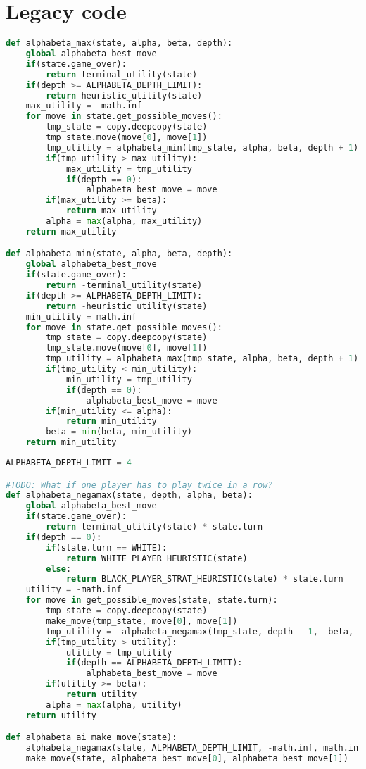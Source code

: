 \hypertarget{legacy-code}{%
\section{Legacy code}\label{legacy-code}}

\begin{lstlisting}[language=Python]
def alphabeta_max(state, alpha, beta, depth):
    global alphabeta_best_move
    if(state.game_over):
        return terminal_utility(state)
    if(depth >= ALPHABETA_DEPTH_LIMIT):
        return heuristic_utility(state)
    max_utility = -math.inf
    for move in state.get_possible_moves():
        tmp_state = copy.deepcopy(state)
        tmp_state.move(move[0], move[1])
        tmp_utility = alphabeta_min(tmp_state, alpha, beta, depth + 1)
        if(tmp_utility > max_utility):
            max_utility = tmp_utility
            if(depth == 0):
                alphabeta_best_move = move
        if(max_utility >= beta):
            return max_utility
        alpha = max(alpha, max_utility)
    return max_utility

def alphabeta_min(state, alpha, beta, depth):
    global alphabeta_best_move
    if(state.game_over):
        return -terminal_utility(state)
    if(depth >= ALPHABETA_DEPTH_LIMIT):
        return -heuristic_utility(state)
    min_utility = math.inf
    for move in state.get_possible_moves():
        tmp_state = copy.deepcopy(state)
        tmp_state.move(move[0], move[1])
        tmp_utility = alphabeta_max(tmp_state, alpha, beta, depth + 1)
        if(tmp_utility < min_utility):
            min_utility = tmp_utility
            if(depth == 0):
                alphabeta_best_move = move
        if(min_utility <= alpha):
            return min_utility
        beta = min(beta, min_utility)
    return min_utility
\end{lstlisting}

\begin{lstlisting}[language=Python]
ALPHABETA_DEPTH_LIMIT = 4

#TODO: What if one player has to play twice in a row?
def alphabeta_negamax(state, depth, alpha, beta):
    global alphabeta_best_move
    if(state.game_over):
        return terminal_utility(state) * state.turn
    if(depth == 0):
        if(state.turn == WHITE):
            return WHITE_PLAYER_HEURISTIC(state)
        else:
            return BLACK_PLAYER_STRAT_HEURISTIC(state) * state.turn
    utility = -math.inf
    for move in get_possible_moves(state, state.turn):
        tmp_state = copy.deepcopy(state)
        make_move(tmp_state, move[0], move[1])
        tmp_utility = -alphabeta_negamax(tmp_state, depth - 1, -beta, -alpha)
        if(tmp_utility > utility):
            utility = tmp_utility
            if(depth == ALPHABETA_DEPTH_LIMIT):
                alphabeta_best_move = move
        if(utility >= beta):
            return utility
        alpha = max(alpha, utility)
    return utility

def alphabeta_ai_make_move(state):
    alphabeta_negamax(state, ALPHABETA_DEPTH_LIMIT, -math.inf, math.inf)
    make_move(state, alphabeta_best_move[0], alphabeta_best_move[1])
\end{lstlisting}
